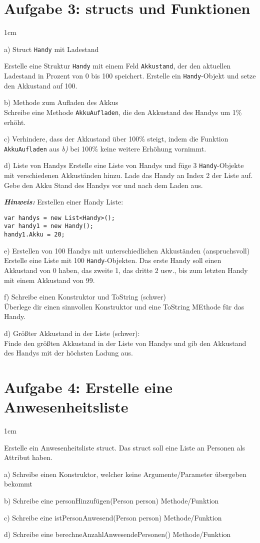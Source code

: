 \documentclass[12pt]{article}
\newenvironment{aufgabe}[2]
  {%
   \section*{Aufgabe #1: #2}
   \vspace{0.5em}
   \begin{adjustwidth}{1cm}{}  %
  }
  {%
   \end{adjustwidth}
  }
\newcommand{\subaufgabe}[1]{
    #1
}
\newcommand{\hint}[1]{
    \vspace{0.5em}
    \textbf{\textit{Hinweis:}} #1
    \vspace{0.5em}
}
\begin{document}
\begin{aufgabe}{3}{structs und Funktionen}

\subaufgabe{a) Struct \texttt{Handy} mit Ladestand}
Erstelle eine Struktur \texttt{Handy} mit einem Feld \texttt{Akkustand}, der den aktuellen Ladestand in Prozent von 0 bis 100 speichert. Erstelle ein \texttt{Handy}-Objekt und setze den Akkustand auf 100.

\subaufgabe{b) Methode zum Aufladen des Akkus \\
Schreibe eine Methode \texttt{AkkuAufladen}, die den Akkustand des Handys um 1\% erhöht.
}

\subaufgabe{c) Verhindere, dass der Akkustand über 100\% steigt, indem die Funktion \texttt{AkkuAufladen} aus \textit{b)} bei 100\% keine weitere Erhöhung vornimmt.
}

\subaufgabe{d) Liste von Handys
Erstelle eine Liste von Handys und füge 3 \texttt{Handy}-Objekte mit verschiedenen Akkuständen hinzu.
Lade das Handy an Index 2 der Liste auf. Gebe den Akku Stand des Handys vor und nach dem Laden aus.
}

\hint{Erstellen einer Handy Liste:}
\begin{lstlisting}
var handys = new List<Handy>();
var handy1 = new Handy();
handy1.Akku = 20; 
\end{lstlisting}

\subaufgabe{e) Erstellen von 100 Handys mit unterschiedlichen Akkuständen (anspruchsvoll) \\
Erstelle eine Liste mit 100 \texttt{Handy}-Objekten. Das erste Handy soll einen Akkustand von 0 haben, das zweite 1, das dritte 2 usw., bis zum letzten Handy mit einem Akkustand von 99.
}

\subaufgabe{f) Schreibe einen Konstruktor und ToString (schwer)\\
Überlege dir einen sinnvollen Konstruktor und eine ToString MEthode für das Handy.
}

\subaufgabe{d) Größter Akkustand in der Liste (schwer):\\
Finde den größten Akkustand in der Liste von Handys und gib den Akkustand des Handys mit der höchsten Ladung aus.
}

\end{aufgabe}

\begin{aufgabe}{4}{Erstelle eine Anwesenheitsliste}

Erstelle ein Anwesenheitsliste struct. Das struct soll eine Liste an Personen als Attribut haben.

\subaufgabe{a) Schreibe einen Konstruktor, welcher keine Argumente/Parameter übergeben bekommt}

\subaufgabe{b) Schreibe eine personHinzufügen(Person person) Methode/Funktion}

\subaufgabe{c) Schreibe eine istPersonAnwesend(Person person) Methode/Funktion}

\subaufgabe{d) Schreibe eine berechneAnzahlAnwesendePersonen() Methode/Funktion}

\end{aufgabe}
\end{document}
